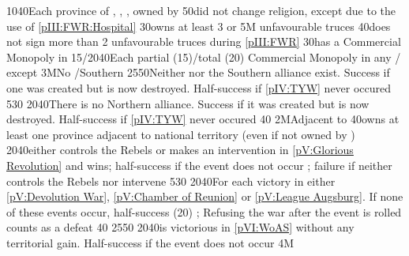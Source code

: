 {10}{40}{Each province of \provinceArtois, \provinceBresse,
  , \provinceRoussillon owned by \paysmajeurFrance}%
%
%
%
{}{50}{\paysmajeurFrance did not change religion, except due to the use of
  \ref{pIII:FWR:Hospital}}%
%
%
%
{}{30}{\paysmajeurFrance owns at least 3 \COL or \TP}%
%
%
\EUobjective5M{ unfavourable truces}{}%
{}{40}{\paysmajeurFrance does not sign more than 2 unfavourable truces during
  \ref{pIII:FWR}}%
%
%
%
{}{30}{\paysmajeurFrance has a Commercial Monopoly in }%
%
%
%
{15/20}{40}{Each partial (15)/total (20) Commercial Monopoly in any \STZ/\CTZ
  except }%
%
%
\EUobjective3M{No \GE/Southern \HRE}{}%
{25}{50}{Neither \GE nor the Southern \HRE alliance exist. Success if one was
  created but is now destroyed. Half-success if \ref{pIV:TYW} never occured}%
%
%
{5}{30}{}%
%
%
{20}{40}{There is no Northern \HRE alliance. Success if it was created but is
  now destroyed. Half-success if \ref{pIV:TYW} never occured}%
%
%
%
{}{40}{}%
%
\EUobjective2M{Adjacent to \paysmajeurHollande}{}%
{}{40}{\paysmajeurFrance owns at least one province adjacent to
  \paysmajeurHollande national territory (even if not owned by \HOL)}%
%
%
{20}{40}{\paysmajeurFrance either controls the Rebels or makes an intervention
  in \ref{pV:Glorious Revolution} and wins; half-success if the event does not
  occur ; failure if \paysmajeurFrance neither controls the Rebels nor intervene}%
%
%
{5}{30}{}%
%
%
{20}{40}{For each victory in either \ref{pV:Devolution War}, \ref{pV:Chamber
    of Reunion} or \ref{pV:League Augsburg}. If none of these events occur,
  half-success (20\VPs) ; Refusing the war after the event is rolled counts as
  a defeat}%
%
%
%
{}{40}{}%
%
%
{25}{50}{\EUobjWoSS{\paysmajeurFrance}}%
%
%
{20}{40}{\paysmajeurFrance is victorious in \ref{pVI:WoAS} without any
  territorial gain. Half-success if the event does not occur}%
%
\EUobjective4M{}{}%
